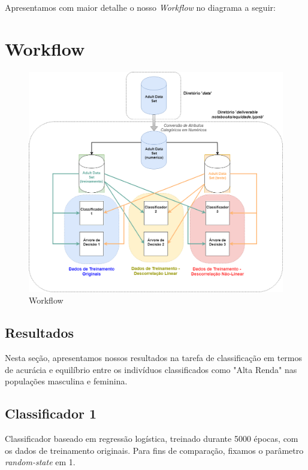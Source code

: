\documentclass[11pt]{article}
\makeatletter
\def\maxwidth{\ifdim\Gin@nat@width>\linewidth\linewidth
    \else\Gin@nat@width\fi}
\let\Oldincludegraphics\includegraphics
\renewcommand{\includegraphics}[1]{\Oldincludegraphics[width=.8\maxwidth]{#1}}
\makeatother
\begin{document}
Apresentamos com maior detalhe o nosso \emph{Workflow} no diagrama a
seguir:

    \section{Workflow}\label{workflow}

\begin{figure}
\centering
\includegraphics{../fig/WorkflowIA369.png}
\caption{Workflow}
\end{figure}

    \subsection{Resultados}\label{resultados}

Nesta seção, apresentamos nossos resultados na tarefa de classificação
em termos de acurácia e equilíbrio entre os indivíduos classificados
como "Alta Renda" nas populações masculina e feminina.

    \subsection{Classificador 1}\label{classificador-1}

Classificador baseado em regressão logística, treinado durante 5000
épocas, com os dados de treinamento originais. Para fins de comparação,
fixamos o parâmetro \emph{random-state} em 1.
\end{document}
